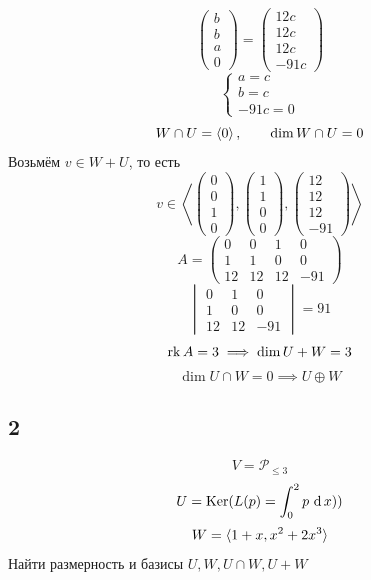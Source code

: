 $$
\begin{pmatrix}
	b \\
    b \\
    a \\
    0
\end{pmatrix} =
\begin{pmatrix}
	12c \\
    12c \\
    12c \\
    -91c
\end{pmatrix} $$
$$
\begin{cases}
	a = c \\
    b = c \\
    -91c = 0
\end{cases} $$
$$ W \cap U = \braket{0}, \qquad \dim W \cap U = 0 $$
Возьмём $ v \in W + U $, то есть
$$ v \in \left\langle
\begin{pmatrix}
	0 \\
    0 \\
    1 \\
    0
\end{pmatrix},
\begin{pmatrix}
	1 \\
    1 \\
    0 \\
    0
\end{pmatrix},
\begin{pmatrix}
	12 \\
    12 \\
    12 \\
    -91
\end{pmatrix} \right\rangle $$
$$ A =
\begin{pmatrix}
	0 & 0 & 1 & 0 \\
    1 & 1 & 0 & 0 \\
    12 & 12 & 12 & -91
\end{pmatrix} $$
$$
\begin{vmatrix}
	0 & 1 & 0 \\
    1 & 0 & 0 \\
    12 & 12 & -91
\end{vmatrix} =
91 $$
$$ \operatorname{rk} A = 3 \implies \dim U + W = 3 $$
$$ \dim U \cap W = 0 \implies U \oplus W $$

\subsection{2}

$$ V = \mathcal{P}_{\le 3} $$
$$ U = \operatorname{Ker}(L(p) = \int_{0}^{2} {p} \, \operatorname{d} {x})) $$
$$ W = \braket{1 + x, x^2 + 2x^3} $$
Найти размерность и базисы $ U, W, U \cap W, U + W $

